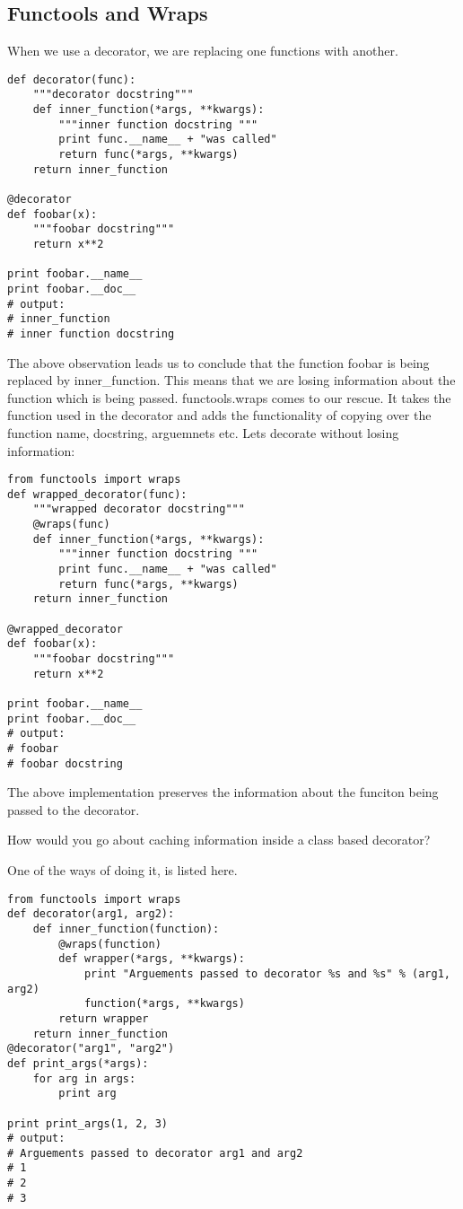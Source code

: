 \subsection{Functools and Wraps}
When we use a decorator, we are replacing one functions with another.

\begin{verbatim}
def decorator(func):
    """decorator docstring"""
    def inner_function(*args, **kwargs):
        """inner function docstring """
        print func.__name__ + "was called"
        return func(*args, **kwargs)
    return inner_function

@decorator
def foobar(x):
    """foobar docstring"""
    return x**2

print foobar.__name__
print foobar.__doc__
# output:
# inner_function
# inner function docstring
\end{verbatim}

The above observation leads us to conclude that the function foobar is being replaced by inner\_function. This means that we are losing information about the function which is being passed. functools.wraps comes to our rescue. It takes the function used in the decorator and adds the functionality of copying over the function name, docstring, arguemnets etc. Lets decorate without losing information:

\begin{verbatim}
from functools import wraps
def wrapped_decorator(func):
    """wrapped decorator docstring"""
    @wraps(func)
    def inner_function(*args, **kwargs):
        """inner function docstring """
        print func.__name__ + "was called"
        return func(*args, **kwargs)
    return inner_function

@wrapped_decorator
def foobar(x):
    """foobar docstring"""
    return x**2

print foobar.__name__
print foobar.__doc__
# output:
# foobar
# foobar docstring
\end{verbatim}
The above implementation preserves the information about the funciton being passed to the decorator.

How would you go about caching information inside a class based decorator?

One of the ways of doing it, is listed here.
\begin{verbatim}
from functools import wraps
def decorator(arg1, arg2):
    def inner_function(function):
        @wraps(function)
        def wrapper(*args, **kwargs):
            print "Arguements passed to decorator %s and %s" % (arg1, arg2)
            function(*args, **kwargs)
        return wrapper
    return inner_function
@decorator("arg1", "arg2")
def print_args(*args):
    for arg in args:
        print arg

print print_args(1, 2, 3)
# output:
# Arguements passed to decorator arg1 and arg2
# 1
# 2
# 3
\end{verbatim}

